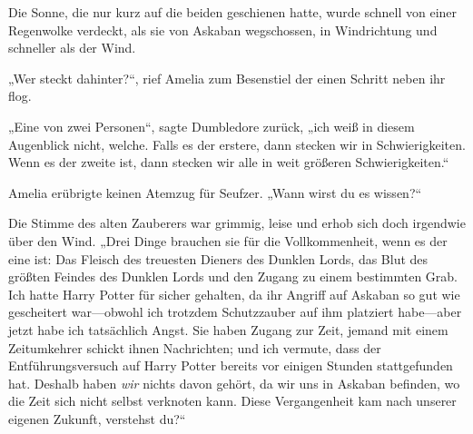 \later

Die Sonne, die nur kurz auf die beiden geschienen hatte, wurde schnell von einer Regenwolke verdeckt, als sie von Askaban wegschossen, in Windrichtung und schneller als der Wind.

„Wer steckt dahinter?“, rief Amelia zum Besenstiel der einen Schritt neben ihr flog.

„Eine von zwei Personen“, sagte Dumbledore zurück, „ich weiß in diesem Augenblick nicht, welche. Falls es der erstere, dann stecken wir in Schwierigkeiten. Wenn es der zweite ist, dann stecken wir alle in weit größeren Schwierigkeiten.“

Amelia erübrigte keinen Atemzug für Seufzer.
„Wann wirst du es wissen?“

Die Stimme des alten Zauberers war grimmig, leise und erhob sich doch irgendwie über den Wind.
„Drei Dinge brauchen sie für die Vollkommenheit, wenn es der eine ist: Das Fleisch des treuesten Dieners des Dunklen Lords, das Blut des größten Feindes des Dunklen Lords und den Zugang zu einem bestimmten Grab. Ich hatte Harry Potter für sicher gehalten, da ihr Angriff auf Askaban so gut wie gescheitert war—obwohl ich trotzdem Schutzzauber auf ihm platziert habe—aber jetzt habe ich tatsächlich Angst. Sie haben Zugang zur Zeit, jemand mit einem Zeitumkehrer schickt ihnen Nachrichten; und ich vermute, dass der Entführungsversuch auf Harry Potter bereits vor einigen Stunden stattgefunden hat. Deshalb haben \emph{wir} nichts davon gehört, da wir uns in Askaban befinden, wo die Zeit sich nicht selbst verknoten kann. Diese Vergangenheit kam nach unserer eigenen Zukunft, verstehst du?“

